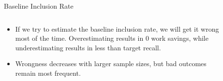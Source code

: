 \documentclass[9pt,aspectratio=169]{beamer}
\begin{document}
\begin{frame}{Baseline Inclusion Rate}

\begin{columns}
	\begin{column}{0.618\linewidth}
		\begin{itemize}
			\item<1-> If we try to estimate the baseline inclusion rate, we will get it wrong most of the time. Overestimating results in 0 work savings, while underestimating results in less than target recall.
			\item<2-> Wrongness decreases with larger sample sizes, but bad outcomes remain most frequent.
		\end{itemize}
	\end{column}
	\begin{column}{0.382\linewidth}
		\begin{figure}
			
		\end{figure}
	\end{column}
\end{columns}

\end{frame}
\end{document}
